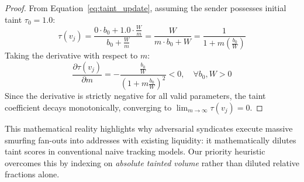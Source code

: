 \begin{proof}
From Equation~\ref{eq:taint_update}, assuming the sender possesses initial taint $\tau_0 = 1.0$:
\begin{equation}
    \tau(v_j) = \frac{0 \cdot b_0 + 1.0 \cdot \frac{W}{m}}{b_0 + \frac{W}{m}} = \frac{W}{m \cdot b_0 + W} = \frac{1}{1 + m \left(\frac{b_0}{W}\right)}
\end{equation}
Taking the derivative with respect to $m$:
\begin{equation}
    \frac{\partial \tau(v_j)}{\partial m} = -\frac{\frac{b_0}{W}}{\left(1 + m \frac{b_0}{W}\right)^2} < 0, \quad \forall b_0, W > 0
\end{equation}
Since the derivative is strictly negative for all valid parameters, the taint coefficient decays monotonically, converging to $\lim_{m \to \infty} \tau(v_j) = 0$.
\end{proof}

This mathematical reality highlights why adversarial syndicates execute massive smurfing fan-outs into addresses with existing liquidity: it mathematically dilutes taint scores in conventional naive tracking models. Our priority heuristic overcomes this by indexing on \emph{absolute tainted volume} rather than diluted relative fractions alone.
